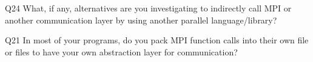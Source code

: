 \begin{description}%
\item{Q24} What, if any, alternatives are you investigating to indirectly call MPI or another communication layer by using another parallel language/library?%
\item{Q21} In most of your programs, do you pack MPI function calls into their own file or files to have your own abstraction layer for communication?%
\end{description}%
